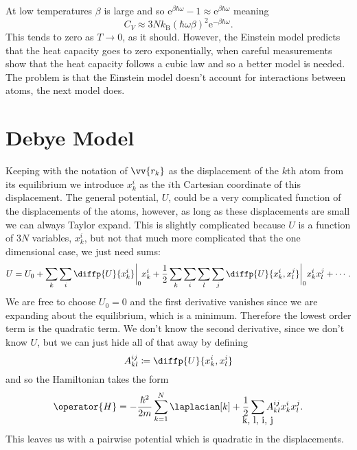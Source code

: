 \documentclass[fleqn]{NotesClass}
\newcommand*{\boltzmann}{k_{\mathrm{B}}}
\newcommand*{\e}{\mathrm{e}}
\begin{document}
    At low temperatures \(\beta\) is large and so \(\e^{\beta\hbar\omega} - 1 \approx \e^{\beta\hbar\omega}\) meaning
    \begin{equation}
        C_V \approx 3N\boltzmann(\hbar\omega\beta)^2 \e^{-\beta\hbar\omega}.
    \end{equation}
    This tends to zero as \(T \to 0\), as it should.
    However, the Einstein model predicts that the heat capacity goes to zero exponentially, when careful measurements show that the heat capacity follows a cubic law and so a better model is needed.
    The problem is that the Einstein model doesn't account for interactions between atoms, the next model does.
    
    \section{Debye Model}
    Keeping with the notation of \(\vv{r_k}\) as the displacement of the \(k\)th atom from its equilibrium we introduce \(x_k^i\) as the \(i\)th Cartesian coordinate of this displacement.
    The general potential, \(U\), could be a very complicated function of the displacements of the atoms, however, as long as these displacements are small we can always Taylor expand.
    This is slightly complicated because \(U\) is a function of \(3N\) variables, \(x_k^i\), but not that much more complicated that the one dimensional case, we just need sums:
    \begin{equation}
        U = U_0 + \sum_{k}\sum_{i} \diffp{U}{x_k^i}\bigg|_{0}x_k^i + \frac{1}{2} \sum_{k}\sum_{i}\sum_{l}\sum_{j} \diffp{U}{x_k^i, x_l^j} \bigg|_{0} x_k^ix_l^j + \dotsb.
    \end{equation}
    We are free to choose \(U_0 = 0\) and the first derivative vanishes since we are expanding about the equilibrium, which is a minimum.
    Therefore the lowest order term is the quadratic term.
    We don't know the second derivative, since we don't know \(U\), but we can just hide all of that away by defining
    \begin{equation}
        A_{kl}^{ij} \coloneqq \diffp{U}{x_k^i, x_l^i}
    \end{equation}
    and so the Hamiltonian takes the form
    \begin{equation}
        \operator{H} = -\frac{\hbar^2}{2m} \sum_{k = 1}^{N} \laplacian[k] + \frac{1}{2}\sum_{\clap{k, l, i, j}} A_{kl}^{ij} x_k^ix_l^j.
    \end{equation}
    This leaves us with a pairwise potential which is quadratic in the displacements.
    
\end{document}
